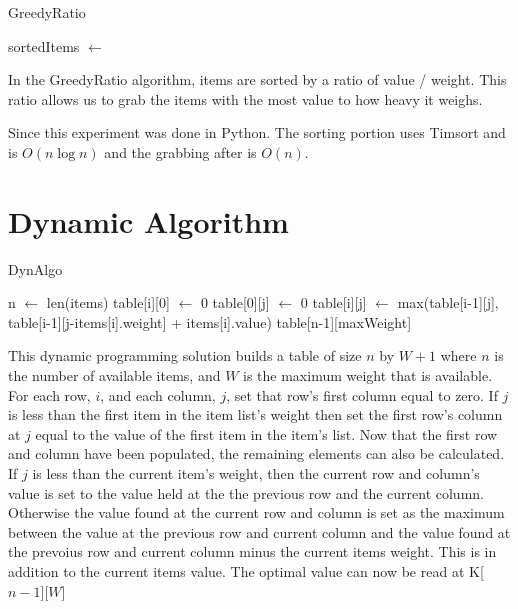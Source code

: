 \documentclass[10pt, letterpaper]{article}
\begin{document}
  \begin{algorithm}[!htp]
    \begin{algorithmic}
      \caption{GreedyRatio}\label{GreedyRatio}
      \State sortedItems $\gets$ 
      \Return {}
      \EndFunction
    \end{algorithmic}
  \end{algorithm}

In the GreedyRatio algorithm, items are sorted by a ratio of value / weight. This ratio allows us to grab the items with the most value to how heavy it weighs.

Since this experiment was done in Python. The sorting portion uses Timsort and is $O(n \log n)$ and the grabbing after is $O(n)$.

\section{Dynamic Algorithm}
\begin{algorithm}[!htp]
  \begin{algorithmic}
    \caption{DynAlgo}\label{DynAlgo}
    \State n $\gets$ len(items)
    \State table[i][0] $\gets$ 0
    \State table[0][j] $\gets$ 0
    \EndIf
    \State table[i][j] $\gets$ max(table[i-1][j], table[i-1][j-items[i].weight] + items[i].value)
    \EndIf
    \EndFor
    \EndFor
    \Return table[n-1][maxWeight]
    \EndFunction
  \end{algorithmic}
\end{algorithm}

This dynamic programming solution builds a table of size $n$ by $W+1$ where $n$ is the number of available items, and $W$ is the maximum weight that is available. For each row, $i$, and each column, $j$,  set that row's first column equal to zero. If $j$ is less than the first item in the item list's weight then set the first row's column at $j$ equal to the value of the first item in the item's list.
Now that the first row and column have been populated, the remaining elements can also be calculated.
If $j$ is less than the current item's weight, then the current row and column's value is set to the value held at the the previous row and the current column. Otherwise the value found at the current row and column is set as the maximum between the value at the previous row and current column and the value found at the prevoius row and current column minus the current items weight. This is in addition to the current items value. The optimal value can now be read at K[$n-1$][$W$]
\end{document}
